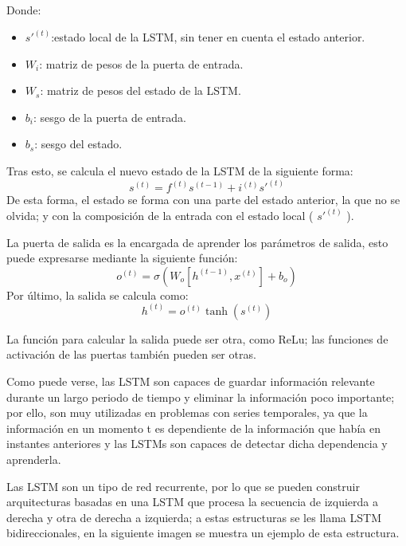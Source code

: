 Donde:
\begin{itemize}
	\item $s'^{(t)}$:estado local de la LSTM, sin tener en cuenta el estado anterior.
	\item $W_i$: matriz de pesos de la puerta de entrada.
	\item $W_s$: matriz de pesos del estado de la LSTM.
	\item $b_i $: sesgo de la puerta de entrada.
	\item $b_s$: sesgo del estado.
\end{itemize}
\verticalspace
Tras esto, se calcula el nuevo estado de la LSTM de la siguiente forma:\newline
$$ s^{(t)} = f^{(t)}s^{(t-1)} + i^{(t)} s'^{(t)} $$
De esta forma, el estado se forma con una parte del estado anterior, la que no se olvida; y con la composición de la entrada con el estado local ( $s'^{(t)}$ ).
\verticalspace

La puerta de salida es la encargada de aprender los parámetros de salida, esto puede expresarse mediante la siguiente función:\newline
$$ o^{(t)} = \sigma(W_o[h^{(t-1)}, x^{(t)}] + b_o) $$
Por último, la salida se calcula como:\newline
$$h^{(t)} = o^{(t)}\tanh(s^{(t)}) $$

La función para calcular la salida puede ser otra, como ReLu; las funciones de activación de las puertas también pueden ser otras.\newline

Como puede verse, las LSTM son capaces de guardar información relevante durante un largo periodo de tiempo y eliminar la información poco importante; por ello, son muy utilizadas en problemas con series temporales, ya que la información en un momento t es dependiente de la información que había en instantes anteriores y las LSTMs son capaces de detectar dicha dependencia y aprenderla.\newline

Las LSTM son un tipo de red recurrente, por lo que se pueden construir arquitecturas basadas en una LSTM que procesa la secuencia de izquierda a derecha y otra de derecha a izquierda; a estas estructuras se les llama LSTM bidireccionales, en la siguiente imagen se muestra un ejemplo de esta estructura.\newline
\newpage

